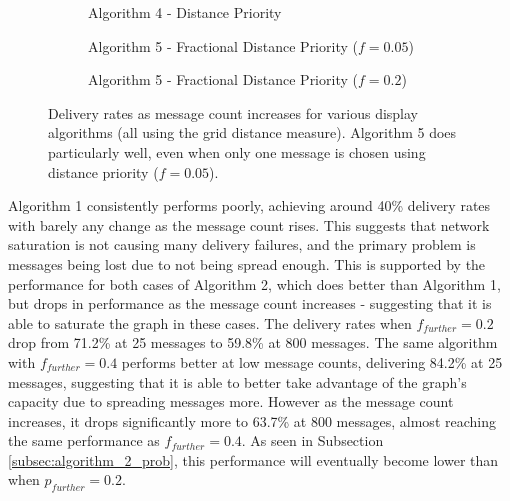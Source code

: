 \documentclass[bsc,frontabs,twoside,singlespacing,parskip,deptreport]{infthesis}     %
\begin{document}
\begin{figure}
\begin{subfigure}[t]{0.49\textwidth}
\begin{tikzpicture}
\end{tikzpicture}
\caption{Algorithm 4 - Distance Priority}
\end{subfigure}
%
\par\bigskip 
%
\begin{subfigure}[t]{0.49\textwidth}
\captionsetup{justification=centering}
\caption{Algorithm 5 - Fractional Distance Priority ($f=0.05$)}
\end{subfigure}
%
\begin{subfigure}[t]{0.49\textwidth}
\captionsetup{justification=centering}
\caption{Algorithm 5 - Fractional Distance Priority ($f=0.2$)}
\end{subfigure}
\caption{Delivery rates as message count increases for various display algorithms (all using the grid distance measure). Algorithm 5 does particularly well, even when only one message is chosen using distance priority ($f=0.05$).}
\label{fig:all_show_models}
\end{figure}

Algorithm 1 consistently performs poorly, achieving around 40\% delivery rates with barely any change as the message count rises. This suggests that network saturation is not causing many delivery failures, and the primary problem is messages being lost due to not being spread enough. This is supported by the performance for both cases of Algorithm 2, which does better than Algorithm 1, but drops in performance as the message count increases - suggesting that it is able to saturate the graph in these cases. The delivery rates when $f_{further}=0.2$ drop from 71.2\% at 25 messages to 59.8\% at 800 messages. The same algorithm with $f_{further}=0.4$ performs better at low message counts, delivering 84.2\% at 25 messages, suggesting that it is able to better take advantage of the graph's capacity due to spreading messages more. However as the message count increases, it drops significantly more to 63.7\% at 800 messages, almost reaching the same performance as $f_{further}=0.4$. As seen in Subsection \ref{subsec:algorithm_2_prob}, this performance will eventually become lower than when $p_{further}=0.2$.
\end{document}
